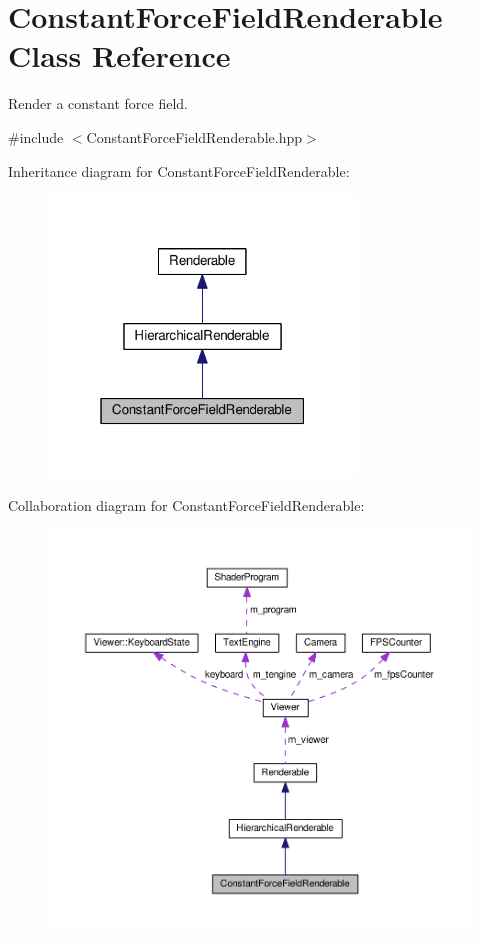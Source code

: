 \hypertarget{classConstantForceFieldRenderable}{\section{Constant\+Force\+Field\+Renderable Class Reference}
\label{classConstantForceFieldRenderable}
}


Render a constant force field.  




{\ttfamily \#include $<$Constant\+Force\+Field\+Renderable.\+hpp$>$}



Inheritance diagram for Constant\+Force\+Field\+Renderable\+:\nopagebreak
\begin{figure}[H]
\begin{center}
\leavevmode
\includegraphics[width=232pt]{classConstantForceFieldRenderable__inherit__graph}
\end{center}
\end{figure}


Collaboration diagram for Constant\+Force\+Field\+Renderable\+:\nopagebreak
\begin{figure}[H]
\begin{center}
\leavevmode
\includegraphics[width=350pt]{classConstantForceFieldRenderable__coll__graph}
\end{center}
\end{figure}
